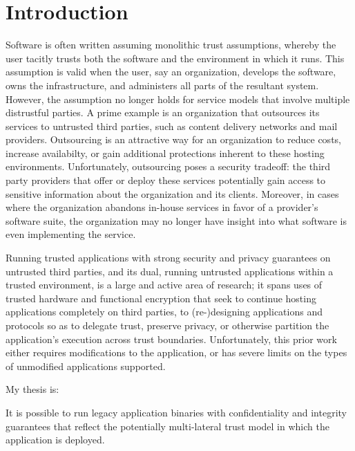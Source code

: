 \section{Introduction}
\label{sec:intro}

Software is often written assuming monolithic trust assumptions, whereby
the user tacitly trusts both the software and the environment in which it runs.
%
This assumption is valid when the user, say an organization, develops the
software, owns the infrastructure, and administers all parts of the resultant
system.
%
However, the assumption no longer holds for service models that involve
multiple distrustful parties.
%
A prime example is an organization that outsources its services to untrusted
third parties, such as content delivery networks and mail providers.
%
Outsourcing is an attractive way for an organization to reduce costs,
increase availabilty, or gain additional protections inherent to these hosting
environments.
%
Unfortunately, outsourcing poses a security tradeoff: the third party
providers that offer or deploy these services potentially gain access to
sensitive information about the organization and its clients.   
%
Moreover, in cases where the organization abandons in-house services in favor
of a provider's software suite, the organization may no longer have insight
into what software is even implementing the service.


%
Running trusted applications with strong security and privacy guarantees on untrusted
third parties, and its dual, running untrusted applications within a
trusted environment, is a large and active area of research; it spans uses of
trusted hardware and functional encryption that seek to continue hosting
applications completely on third parties, to (re-)designing applications and
protocols so as to delegate trust, preserve privacy, or otherwise partition
the application's execution across trust boundaries.
%
Unfortunately, this prior work either requires modifications to the
application, or has severe limits on the types of unmodified applications
supported.


My thesis is:
\begin{displayquote}
    It is possible to run legacy application binaries with confidentiality and
    integrity guarantees that reflect the potentially multi-lateral trust model
    in which the application is deployed.
\end{displayquote}

